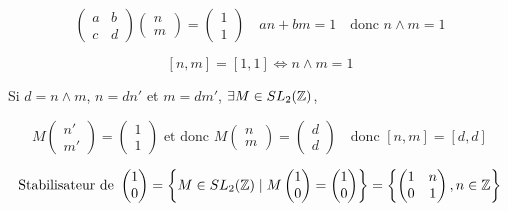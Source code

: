 \[
    \begin{pmatrix} a & b \\ c & d \end{pmatrix} \begin{pmatrix} n \\ m \end{pmatrix} = \begin{pmatrix} 1 \\ 1 \end{pmatrix} \quad an + bm = 1 \quad \text{donc } n \wedge m = 1
\]

\[ [n, m] = [1, 1] \iff n \wedge m = 1 \]

Si $d = n \wedge m$, $n = d n'$ et $m = d m'$, $\exists M \in SL_2(\mathbb{Z})$,

\[
    M \begin{pmatrix} n' \\ m' \end{pmatrix} = \begin{pmatrix} 1 \\ 1 \end{pmatrix} \text{ et donc } M \begin{pmatrix} n \\ m \end{pmatrix} = \begin{pmatrix} d \\ d \end{pmatrix} \quad \text{donc } [n, m] = [d, d]
\]

\[
    \text{Stabilisateur de } \begin{pmatrix} 1 \\ 0 \end{pmatrix} = \left\{ M \in SL_2(\mathbb{Z}) \mid M \begin{pmatrix} 1 \\ 0 \end{pmatrix} = \begin{pmatrix} 1 \\ 0 \end{pmatrix} \right\} = \left\{ \begin{pmatrix} 1 & n \\ 0 & 1 \end{pmatrix}, n \in \mathbb{Z} \right\}
\]
\begin{center}
\end{center}

